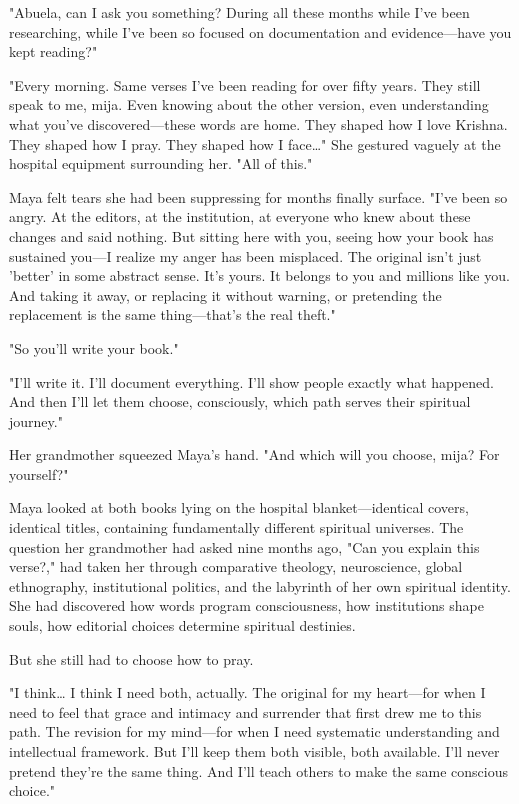 \documentclass[12pt,twoside]{book}
\begin{document}
"Abuela, can I ask you something? During all these months while I've been researching, while I've been so focused on documentation and evidence—have you kept reading?"

"Every morning. Same verses I've been reading for over fifty years. They still speak to me, mija. Even knowing about the other version, even understanding what you've discovered—these words are home. They shaped how I love Krishna. They shaped how I pray. They shaped how I face\ldots{}" She gestured vaguely at the hospital equipment surrounding her. "All of this."

Maya felt tears she had been suppressing for months finally surface. "I've been so angry. At the editors, at the institution, at everyone who knew about these changes and said nothing. But sitting here with you, seeing how your book has sustained you—I realize my anger has been misplaced. The original isn't just 'better' in some abstract sense. It's yours. It belongs to you and millions like you. And taking it away, or replacing it without warning, or pretending the replacement is the same thing—that's the real theft."

"So you'll write your book."

"I'll write it. I'll document everything. I'll show people exactly what happened. And then I'll let them choose, consciously, which path serves their spiritual journey."

Her grandmother squeezed Maya's hand. "And which will you choose, mija? For yourself?"

Maya looked at both books lying on the hospital blanket—identical covers, identical titles, containing fundamentally different spiritual universes. The question her grandmother had asked nine months ago, "Can you explain this verse?," had taken her through comparative theology, neuroscience, global ethnography, institutional politics, and the labyrinth of her own spiritual identity. She had discovered how words program consciousness, how institutions shape souls, how editorial choices determine spiritual destinies.

But she still had to choose how to pray.

"I think\ldots{} I think I need both, actually. The original for my heart—for when I need to feel that grace and intimacy and surrender that first drew me to this path. The revision for my mind—for when I need systematic understanding and intellectual framework. But I'll keep them both visible, both available. I'll never pretend they're the same thing. And I'll teach others to make the same conscious choice."
\end{document}
